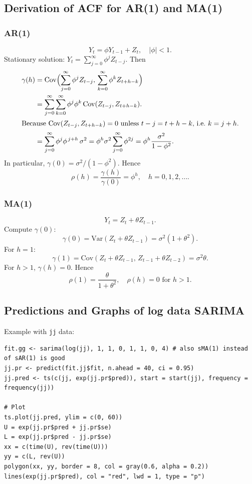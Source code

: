 \documentclass[11pt]{article}
\newcommand{\noi}{\noindent}
\begin{document}
\subsection{Derivation of ACF for AR(1) and MA(1)}
\subsubsection{AR(1)}
\[
Y_t = \phi Y_{t-1} + Z_t, \quad |\phi|<1.
\]
\noindent Stationary solution: \(Y_t = \sum_{j=0}^{\infty} \phi^j Z_{t-j}\). Then
\begin{align*}
\gamma(h) 
&= \mathrm{Cov}\Bigl(\sum_{j=0}^\infty \phi^j Z_{t-j},\,\sum_{k=0}^\infty \phi^k Z_{t+h-k}\Bigr) \\
&= \sum_{j=0}^\infty \sum_{k=0}^\infty \phi^j \phi^k \,\mathrm{Cov}(Z_{t-j},Z_{t+h-k}). \\
\intertext{Because \(\mathrm{Cov}(Z_{t-j},Z_{t+h-k}) = 0\) unless \(t-j = t+h-k\), i.e.\ \(k = j + h\).}
&= \sum_{j=0}^\infty \phi^j \phi^{\,j+h} \,\sigma^2 
= \phi^h \sigma^2 \sum_{j=0}^\infty \phi^{2j} 
= \phi^h \frac{\sigma^2}{1 - \phi^2}.
\end{align*}
\noindent In particular, \(\gamma(0) = \sigma^2/(1-\phi^2)\). Hence
\[
\rho(h) = \frac{\gamma(h)}{\gamma(0)} = \phi^h, \quad h=0,1,2,\dots.
\]

\subsubsection{MA(1)}
\[
Y_t = Z_t + \theta Z_{t-1}.
\]
\noindent Compute \(\gamma(0)\):
\[
\gamma(0) 
= \mathrm{Var}(Z_t + \theta Z_{t-1}) 
= \sigma^2(1 + \theta^2).
\]
\noindent For \(h=1\):
\[
\gamma(1) 
= \mathrm{Cov}(Z_t + \theta Z_{t-1},\,Z_{t-1} + \theta Z_{t-2})
= \sigma^2 \theta.
\]
\noindent For \(h>1\), \(\gamma(h)=0\). Hence
\[
\rho(1) = \frac{\theta}{1 + \theta^2}, 
\quad \rho(h) = 0 \text{ for } h>1.
\]

\subsection{Predictions and Graphs of log data SARIMA}
\noi Example with \texttt{jj} data:
\begin{lstlisting}
fit.gg <- sarima(log(jj), 1, 1, 0, 1, 1, 0, 4) # also sMA(1) instead of sAR(1) is good
jj.pr <- predict(fit.jj$fit, n.ahead = 40, ci = 0.95)
jj.pred <- ts(c(jj, exp(jj.pr$pred)), start = start(jj), frequency = frequency(jj))

# Plot
ts.plot(jj.pred, ylim = c(0, 60))
U = exp(jj.pr$pred + jj.pr$se)
L = exp(jj.pr$pred - jj.pr$se)
xx = c(time(U), rev(time(U)))
yy = c(L, rev(U))
polygon(xx, yy, border = 8, col = gray(0.6, alpha = 0.2))
lines(exp(jj.pr$pred), col = "red", lwd = 1, type = "p")
\end{lstlisting}
\end{document}

